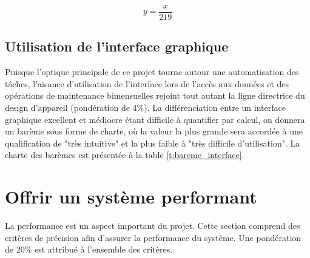 \begin{equation}
    y = \frac{x}{219}
    \label{eq:bareme_gpu}
\end{equation}

\subsection{Utilisation de l'interface graphique}
\label{UIG}

\begin{table}[htb!]
   \footnotesize
   \centering
   \caption{Évaluation du barème de l'interface graphique}
   \label{t:bareme_interface}
\end{table}

Puisque l'optique principale de ce projet tourne autour une automatisation des tâches, l'aisance d'utilisation de l'interface lors de l'accès aux données et des opérations de maintenance bimensuelles rejoint tout autant la ligne directrice du design d'appareil (pondération de 4\%). La différenciation entre un interface graphique excellent et médiocre étant difficile à quantifier par calcul, on donnera un barème sous forme de charte, où la valeur la plus grande sera accordée à une qualification de "très intuitive" et la plus faible à "très difficile d'utilisation". La charte des barèmes est présentée à la table \ref{t:bareme_interface}. 


\section{Offrir un système performant}
\label{s:performance}
La performance est un aspect important du projet. Cette section comprend des critères de précision afin d'assurer la performance du système. Une pondération de 20\% est attribué à l'ensemble des critères.

